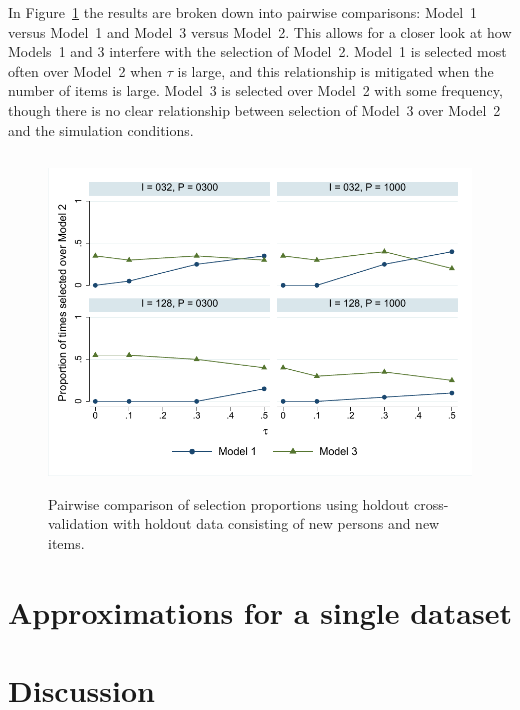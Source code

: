 \documentclass[12pt, letterpaper]{article}
\begin{document}
In Figure~\ref{fig:both-line} the results are broken down into pairwise comparisons: Model~1 versus Model~1 and Model~3 versus Model~2. This allows for a closer look at how Models~1 and 3 interfere with the selection of Model~2. Model~1 is selected most often over Model~2 when $\tau$ is large, and this relationship is mitigated when the number of items is large. Model~3 is selected over Model~2 with some frequency, though there is no clear relationship between selection of Model~3 over Model~2 and the simulation conditions.

\begin{figure}[htbp]
	\centering
	\includegraphics[height=3.5in, trim = 1mm 1mm 1mm 1mm, clip=true]
		{chapter_2/figs/both_line.pdf}
	\caption{Pairwise comparison of selection proportions using holdout cross-validation with holdout data consisting of new persons and new items.}
	\label{fig:both-line}
\end{figure}


\section{Approximations for a single dataset}


\section{Discussion}



%
%
\end{document}
